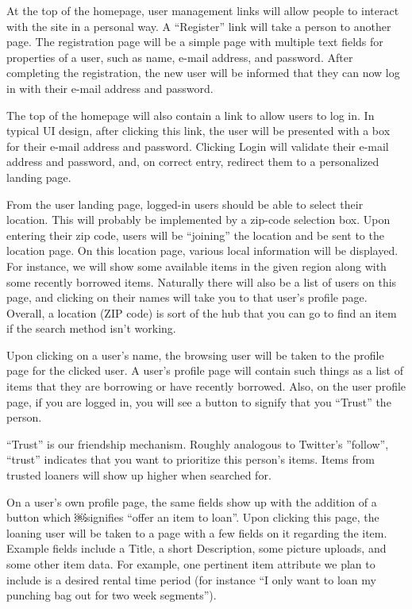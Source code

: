 \documentclass{acm_proc_article-sp}
\begin{document}
At the top of the homepage, user management links will allow people to interact with the site in a personal way. 
A ``Register'' link will take a person to another page. The registration page will be a simple page with multiple 
text fields for properties of a user, such as name, e-mail address, and password. After completing the registration, the new user will be informed that they can now log in with their e-mail address and password.

The top of the homepage will also contain a link to allow users to log in. In typical UI design, after clicking this link, the user will be presented with a box for their e-mail address and password. Clicking Login will validate their e-mail address and password, and, on correct entry, redirect them to a personalized landing page.

From the user landing page, logged-in users should be able to select their location. This will probably be implemented by a zip-code selection box. Upon entering their zip code, users will be ``joining'' the location and be sent to the location page.
On this location page, various local information will be displayed. For instance, we will show some available items in the given region along with some recently borrowed items. Naturally there will also be a list of users on this page, and clicking on their names will take you to that user's profile page. Overall, a location (ZIP code) is sort of the hub that you can go to find an item if the search method isn't working.

Upon clicking on a user's name, the browsing user will be taken to the profile page for the clicked user. A user's profile page will contain such things as a list of items that they are borrowing or have recently borrowed. Also, on the user profile page, if you are logged in, you will see a button to signify that you ``Trust'' the person.

``Trust'' is our friendship mechanism. Roughly analogous to Twitter's ''follow'', ``trust'' indicates that you want to prioritize this person's items. Items from trusted loaners will show up higher when searched for.

On a user's own profile page, the same fields show up with the addition of a button which
￼signifies ``offer an item to loan''. Upon clicking this page, the loaning user will be taken to a page with a few fields on it regarding the item. Example fields include a Title, a short Description, some picture uploads, and some other item data. For example, one pertinent item attribute we plan to include is a desired rental time period (for instance ``I only want to loan my punching bag out for two week segments'').
\end{document}
